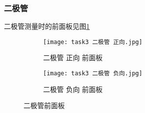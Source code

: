 \documentclass[11pt]{article}
\begin{document}
	\subsubsection{二极管}
	二极管测量时的前面板见图\ref{fig:二极管前面板}
	\begin{figure}[h!]
		\centering
		\begin{subfigure}[t]{0.45\textwidth}  %
			\centering
			\texttt{[image: task3 二极管 正向.jpg]}  %
			\caption{二极管 正向 前面板}
		\end{subfigure}
		\begin{subfigure}[t]{0.45\textwidth}  %
			\centering
			\texttt{[image: task3 二极管 负向.jpg]}  %
			\caption{二极管 负向 前面板}
		\end{subfigure}
		\caption{二极管前面板}
		\label{fig:二极管前面板}
	\end{figure}
	
\end{document}
